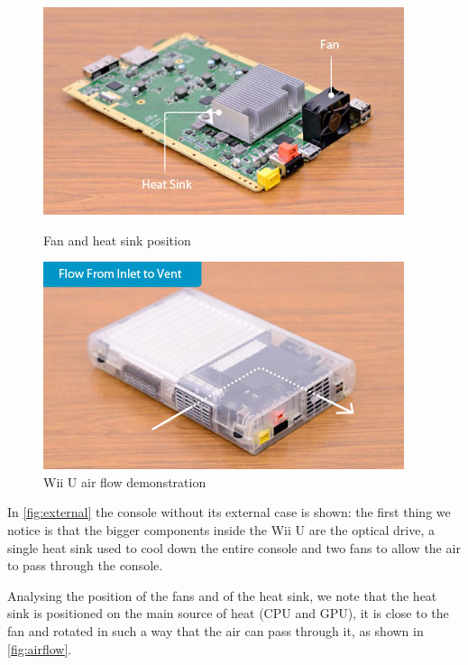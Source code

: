 \documentclass[11pt,a4paper,titlepage]{article}
\begin{document}
		\begin{figure}[ht]
			\centering
			\begin{minipage}{0.45\textwidth}
				\centering
				\includegraphics[width=\textwidth]{fan-heatsink.jpeg}
				\caption{Fan and heat sink position}
				\label{fig:fan-heatsink}
			\end{minipage}
			\hspace{0.5cm}
			\begin{minipage}{0.45\textwidth}
				\centering
				\includegraphics[width=\textwidth]{air_flow.jpeg}
				\caption{Wii U air flow demonstration}
				\label{fig:airflow}
			\end{minipage}
		\end{figure}

		In \autoref{fig:external} the console without its external case is shown: the first thing we notice is that the bigger components inside the Wii U are the optical drive, a single heat sink used to cool down the entire console and two fans to allow the air to pass through the console.

		Analysing the position of the fans and of the heat sink, we note that the heat sink is positioned on the main source of heat (CPU and GPU), it is close to the fan and rotated in such a way that the air can pass through it, as shown in \autoref{fig:airflow}.
\end{document}
